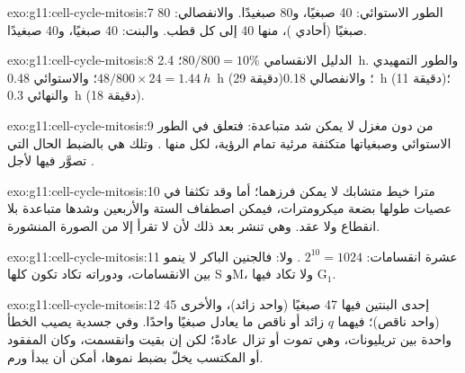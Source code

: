 \begin{solution}{exo:g11:cell-cycle-mitosis:7}
الطور الاستوائي: 40 صبغيًا، و80 صبغيدًا. والانفصالي: 80 صبغيًا (أحادي
)، منها 40 إلى كل قطب. والبنت: 40 صبغيًا، و40 صبغيدًا.
\end{solution}

\begin{solution}{exo:g11:cell-cycle-mitosis:8}
الدليل الانقسامي $80/800 = 10\%$؛  \qty{2.4}{h}.
والطور التمهيدي $48/800 \times 24 = \qty{1.44}{h}$؛ والاستوائي
\qty{0.48}{h} (29 دقيقة)؛ والانفصالي \qty{0.18}{h} (11 دقيقة)؛
والنهائي \qty{0.3}{h} (18 دقيقة).
\end{solution}

\begin{solution}{exo:g11:cell-cycle-mitosis:9}
من دون مغزل لا يمكن شد  متباعدة: فتعلق  في الطور
الاستوائي وصبغياتها متكثفة مرئية تمام الرؤية، لكل منها . وتلك
هي بالضبط الحال التي تصوَّر فيها  لأجل .
\end{solution}

\begin{solution}{exo:g11:cell-cycle-mitosis:10}
مترا خيط متشابك لا يمكن فرزهما؛ أما وقد تكثفا في عصيات طولها بضعة
ميكرومترات، فيمكن اصطفاف  الستة والأربعين وشدها متباعدة بلا
انقطاع ولا عقد. وهي تنشر بعد ذلك لأن  لا تقرأ إلا من الصورة
المنشورة.
\end{solution}

\begin{solution}{exo:g11:cell-cycle-mitosis:11}
عشرة انقسامات: $2^{10} = 1024$ . ولا: فالجنين الباكر لا ينمو بين
الانقسامات، ودوراته تكاد تكون كلها S وM، ولا تكاد فيها
$\mathrm{G_1}$.
\end{solution}

\begin{solution}{exo:g11:cell-cycle-mitosis:12}
إحدى البنتين فيها 47 صبغيًا (واحد زائد)، والأخرى 45 (واحد ناقص)؛
 فيهما $q$ زائد أو ناقص ما يعادل صبغيًا واحدًا. وفي  جسدية
يصيب الخطأ  واحدة بين تريليونات، وهي تموت أو تزال عادةً؛ لكن إن
بقيت  وانقسمت، وكان  المفقود أو المكتسب يخلّ بضبط نموها،
أمكن أن يبدأ ورم.
\end{solution}

